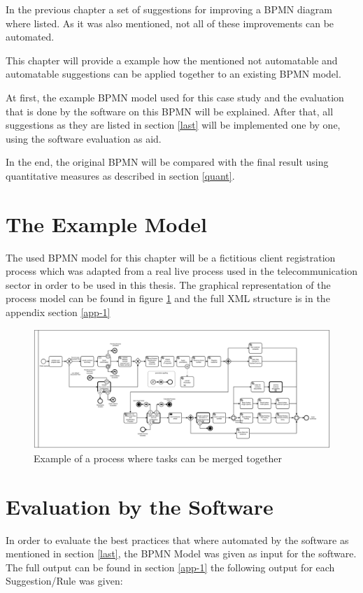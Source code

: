 \label{chapter-5}
In the previous chapter a set of suggestions for improving a BPMN diagram where listed. As it was also mentioned, not all of these improvements can be automated. 

This chapter will provide a example how the mentioned not automatable and automatable suggestions can be applied together to an existing BPMN model. 

At first, the example BPMN model used for this case study and the evaluation that is done by the software on this BPMN will be explained. After that, all suggestions as they are listed in section \ref{last} will be implemented one by one, using the software evaluation as aid. 

In the end, the original BPMN will be compared with the final result using quantitative measures as described in section \ref{quant}.

\section{The Example Model}
The used BPMN model for this chapter will be a fictitious client registration process which was adapted from a real live process used in the telecommunication sector in order to be used in this thesis. The graphical representation of the process model can be found in figure \ref{fig:example-process} and the full XML structure is in the appendix section \ref{app-1}

\begin{figure}[H]
	\centering
	\includegraphics[width=1.7\columnwidth, angle=90 ]{graphics/process-bpmn.pdf}
	\caption{Example of a process where tasks can be merged together} 
	\label{fig:example-process} 
\end{figure}

\section{Evaluation by the Software}
In order to evaluate the best practices that where automated by the software as mentioned in section \ref{last}, the BPMN Model was given as input for the software. The full output can be found in section \ref{app-1} the following output for each Suggestion/Rule was given:
